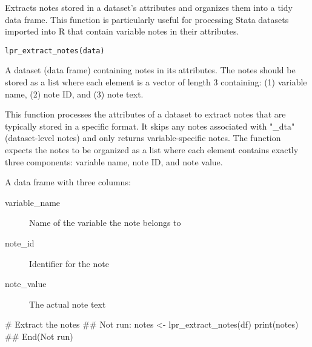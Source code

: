\documentclass[a4paper]{book}
\begin{document}
%
\begin{Description}
Extracts notes stored in a dataset's attributes and organizes them into a tidy data frame.
This function is particularly useful for processing Stata datasets imported into R that
contain variable notes in their attributes.
\end{Description}
%
\begin{Usage}
\begin{verbatim}
lpr_extract_notes(data)
\end{verbatim}
\end{Usage}
%
\begin{Arguments}
\begin{ldescription}
\item[\code{data}] A dataset (data frame) containing notes in its attributes. The notes should
be stored as a list where each element is a vector of length 3 containing:
(1) variable name, (2) note ID, and (3) note text.
\end{ldescription}
\end{Arguments}
%
\begin{Details}
This function processes the attributes of a dataset to extract notes that are typically
stored in a specific format. It skips any notes associated with "\_dta" (dataset-level notes)
and only returns variable-specific notes. The function expects the notes to be organized
as a list where each element contains exactly three components: variable name, note ID,
and note value.
\end{Details}
%
\begin{Value}
A data frame with three columns:
\begin{description}

\item[variable\_name] Name of the variable the note belongs to
\item[note\_id] Identifier for the note
\item[note\_value] The actual note text

\end{description}

\end{Value}
%
\begin{Examples}
\begin{ExampleCode}
# Extract the notes
## Not run: 
notes <- lpr_extract_notes(df)
print(notes)
## End(Not run)
\end{ExampleCode}
\end{Examples}
\end{document}
